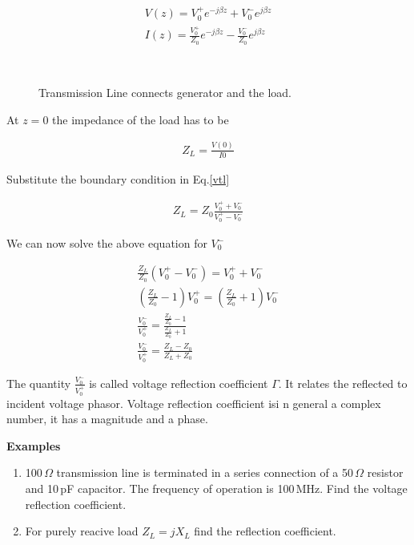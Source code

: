 \begin{eqnarray}
V(z)=V_0^+ e^{-j \beta z} +V_0^- e^{j \beta z} \label{vtl} \\ \label{ctl}
I(z)=\frac{V_0^+}{Z_0} e^{- j \beta z} - \frac{V_0^-}{Z_0} e^{j \beta z}
\end{eqnarray}



\begin{figure}[htbp]
\begin{center}
\strut{} \\
\end{center}
\caption{Transmission Line connects generator and the load.}
\label{wind}
\end{figure}





At $z=0$ the impedance of the load has to be

\begin{eqnarray}
Z_L=\frac{V(0)}{I{0}} \nonumber 
\end{eqnarray}

Substitute the boundary condition in Eq.\ref{vtl}

\begin{eqnarray}
Z_L=Z_0 \frac{V_0^+ + V_0^-}{V_0^+ - V_0^-}
\end{eqnarray}


We can now solve the above equation for $V_0^-$

\begin{eqnarray}
\frac{Z_L}{Z_0} (V_0^+ - V_0^-) = V_0^+ + V_0^- \nonumber \\
(\frac{Z_L}{Z_0}-1)V_0^+ =(\frac{Z_L}{Z_0}+1) V_0^- \nonumber \\
\frac{V_0^-}{V_0^+} = \frac{\frac{Z_L}{Z_0}-1  }{ \frac{Z_L}{Z_0}+1 }
\nonumber \\
\frac{V_0^-}{V_0^+} = \frac{Z_L -Z_0}{Z_L +Z_0}
\end{eqnarray}

The quantity $\frac{V_0^-}{V_0^+}$ is called voltage reflection
coefficient $\Gamma$. It relates the reflected to incident voltage
phasor. Voltage reflection coefficient isi n general a complex number,
it has a magnitude and a phase.


{\bf Examples}
 \begin{enumerate}
\item 100\,$\Omega$ transmission line is terminated in a series
connection of a 50\,$\Omega$ resistor and 10\,pF capacitor. The frequency
of operation is 100\,MHz. Find the voltage reflection coefficient.
\item For purely reacive load $Z_L=j X_L$ find the reflection
coefficient.
\end{enumerate}

